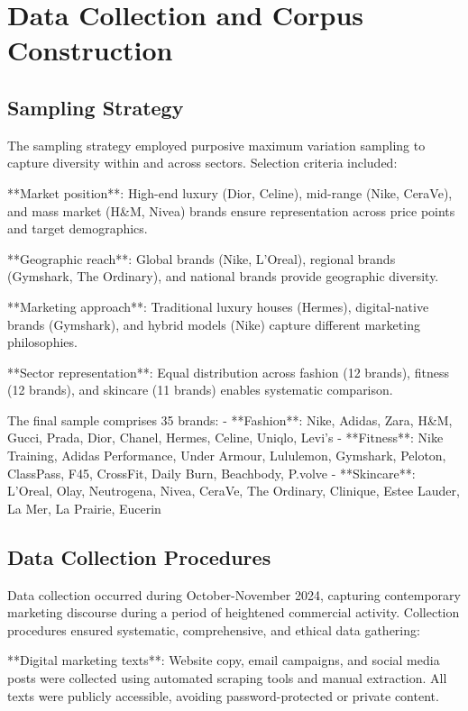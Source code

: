 \section{Data Collection and Corpus Construction}
\label{sec:data_collection}

\subsection{Sampling Strategy}

The sampling strategy employed purposive maximum variation sampling to capture diversity within and across sectors. Selection criteria included:

**Market position**: High-end luxury (Dior, Celine), mid-range (Nike, CeraVe), and mass market (H&M, Nivea) brands ensure representation across price points and target demographics.

**Geographic reach**: Global brands (Nike, L'Oreal), regional brands (Gymshark, The Ordinary), and national brands provide geographic diversity.

**Marketing approach**: Traditional luxury houses (Hermes), digital-native brands (Gymshark), and hybrid models (Nike) capture different marketing philosophies.

**Sector representation**: Equal distribution across fashion (12 brands), fitness (12 brands), and skincare (11 brands) enables systematic comparison.

The final sample comprises 35 brands:
- **Fashion**: Nike, Adidas, Zara, H&M, Gucci, Prada, Dior, Chanel, Hermes, Celine, Uniqlo, Levi's
- **Fitness**: Nike Training, Adidas Performance, Under Armour, Lululemon, Gymshark, Peloton, ClassPass, F45, CrossFit, Daily Burn, Beachbody, P.volve
- **Skincare**: L'Oreal, Olay, Neutrogena, Nivea, CeraVe, The Ordinary, Clinique, Estee Lauder, La Mer, La Prairie, Eucerin

\subsection{Data Collection Procedures}

Data collection occurred during October-November 2024, capturing contemporary marketing discourse during a period of heightened commercial activity. Collection procedures ensured systematic, comprehensive, and ethical data gathering:

**Digital marketing texts**: Website copy, email campaigns, and social media posts were collected using automated scraping tools and manual extraction. All texts were publicly accessible, avoiding password-protected or private content.

